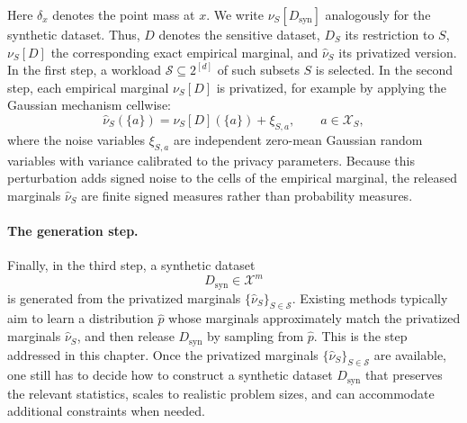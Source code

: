 Here \(\delta_x\) denotes the point mass at \(x\). We write \(\nu_S[D_{\mathrm{syn}}]\) analogously for the synthetic dataset. Thus, \(D\) denotes the sensitive dataset, \(D_S\) its restriction to \(S\), \(\nu_S[D]\) the corresponding exact empirical marginal, and \(\hat{\nu}_S\) its privatized version.
In the first step, a workload \(\mathcal{S} \subseteq 2^{[d]}\) of such subsets \(S\) is selected. In the second step, each empirical marginal \(\nu_S[D]\) is privatized, for example by applying the Gaussian mechanism \citep{dwork2014algorithmic} cellwise:
\[
  \hat{\nu}_S(\{a\}) = \nu_S[D](\{a\}) + \xi_{S,a},
  \qquad a \in \mathcal{X}_S,
\]
where the noise variables \(\xi_{S,a}\) are independent zero-mean Gaussian random variables with variance calibrated to the privacy parameters. Because this perturbation adds signed noise to the cells of the empirical marginal, the released marginals \(\hat{\nu}_S\) are finite signed measures rather than probability measures.

\begin{algorithm}[t]
  \caption{Standard marginal-based synthesis framework. PrivPGD addresses the third step, namely the generation of a synthetic dataset from privatized marginals.}
  \label{alg:privpgd-framework}
  \centering
\end{algorithm}

\paragraph{The generation step.}
Finally, in the third step, a synthetic dataset
\[
  D_{\mathrm{syn}} \in \mathcal{X}^m
\]
is generated from the privatized marginals \(\{\hat{\nu}_S\}_{S \in \mathcal{S}}\). Existing methods typically aim to learn a distribution \(\hat p\) whose marginals approximately match the privatized marginals \(\hat{\nu}_S\), and then release \(D_{\mathrm{syn}}\) by sampling from \(\hat p\). This is the step addressed in this chapter. Once the privatized marginals \(\{\hat{\nu}_S\}_{S \in \mathcal{S}}\) are available, one still has to decide how to construct a synthetic dataset \(D_{\mathrm{syn}}\) that preserves the relevant statistics, scales to realistic problem sizes, and can accommodate additional constraints when needed.
